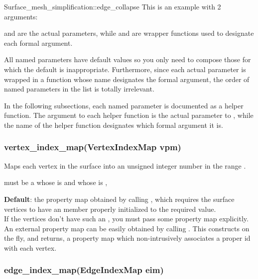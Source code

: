 \begin{ccRefFunction}{Surface_mesh_simplification::edge_collapse}
This is an example with 2 arguments:


 and  are
the actual parameters, while  and 
are wrapper functions used to designate each formal argument.

All named parameters have default values so you only need to compose those for which the default
is inappropriate. Furthermore, since each actual parameter is wrapped in a function whose name
designates the formal argument, the order of named parameters in the list is totally irrelevant.

In the following subsections, each named parameter is documented as a helper function. The argument to each helper
function is the actual parameter to , while the name of the helper 
function designates which formal argument it is.

\subsubsection*{vertex\_index\_map(VertexIndexMap vpm)}

Maps each vertex in the surface into an unsigned integer number
in the range \ccc{[0,num_vertices(surface))}.

 must be a
whose  is
and whose  is 
,

\textbf{Default}: the property map obtained by calling ,
which requires the surface vertices to have an  member properly initialized to the 
required value.\\
If the vertices don't have such an , you must pass some property map explicitly.
An external property map can be easily obtained by calling 
. This constructs on the fly, and returns,
a property map which non-intrusively associates a proper id with each vertex.

\subsubsection*{edge\_index\_map(EdgeIndexMap eim)} 


\end{ccRefFunction}
